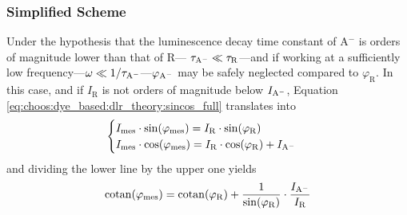 \subsubsection{Simplified Scheme}\label{subsect:choos:dye_based:dlr_theory:simplified_scheme}

Under the hypothesis that the luminescence decay time constant of A$^-$ is orders of magnitude lower than that of R---\ie{} $\tau_\mathrm{A^{\smash{-}}} \ll \tau_\mathrm{R}$---and if working at a sufficiently low frequency---$\omega \ll 1/ \tau_\mathrm{A^{\smash{-}}}$---$\varphi_\mathrm{A^{\smash{-}}}$ may be safely neglected compared to $\varphi_\text{R}$. In this case, and if $I_\mathrm{R}$ is not orders of magnitude below $I_\mathrm{A^{\smash{-}}}$, Equation \ref{eq:choos:dye_based:dlr_theory:sincos_full} translates into
\begin{equation}
	\begin{cases}
		I_\text{mes} \cdot \sin(\varphi_\text{mes}) = I_\mathrm{R} \cdot \sin(\varphi_\mathrm{R})\\
		I_\text{mes} \cdot \cos(\varphi_\text{mes}) = I_\mathrm{R} \cdot \cos(\varphi_\mathrm{R}) + I_\mathrm{A^{\smash{-}}}
	\end{cases}
\end{equation}
and dividing the lower line by the upper one yields
\begin{equation}\label{eq:choos:dye_based:dlr_theory:dlr_cotan}
	\operatorname{cotan}(\varphi_\text{mes}) = \operatorname{cotan}(\varphi_\mathrm{R}) + \frac{1}{\sin(\varphi_\mathrm{R})} \cdot \frac{I_\mathrm{A^{\smash{-}}}}{I_\mathrm{R}}
\end{equation}

